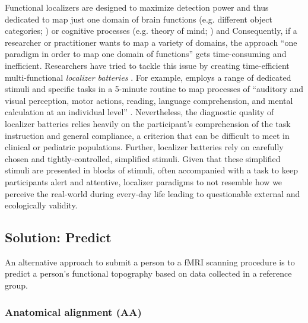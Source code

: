 Functional localizers are designed to maximize detection power and thus
dedicated to map just one domain of brain functions (e.g. different object
categories; \citet{kanwisher1997ffa}) or cognitive processes (e.g. theory of
mind; \citet{spunt2014validating}) and
Consequently, if a researcher or practitioner wants to map a variety of domains,
the approach ``one paradigm in order to map one domain of functions'' gets
time-consuming and inefficient.
Researchers have tried to tackle this issue by creating time-efficient
multi-functional \textit{localizer batteries} \citep{pinel2007fast,
pinho2018individual, pinho2020individual}.
For example, \citet{pinel2007fast} employs a range of dedicated stimuli and
specific tasks in a 5-minute routine to map processes of ``auditory and visual
perception, motor actions, reading, language comprehension, and mental
calculation at an individual level'' \citet{pinel2007fast}.
Nevertheless, the diagnostic quality of localizer batteries relies heavily on
the participant's comprehension of the task instruction and general compliance,
a criterion that can be difficult to meet in clinical or pediatric populations.
Further, localizer batteries rely on carefully chosen and tightly-controlled,
simplified stimuli.
%
Given that these simplified stimuli are presented in blocks of stimuli, often
accompanied with a task to keep participants alert and attentive, localizer
paradigms to not resemble how we perceive the real-world during every-day life
leading to questionable external and ecologically validity.



\subsection{Solution: Predict}

An alternative approach to submit a person to a \ac{fMRI} scanning procedure is
to predict a person's functional topography based on data collected in a
reference group.

\subsubsection{Anatomical alignment (AA)}

